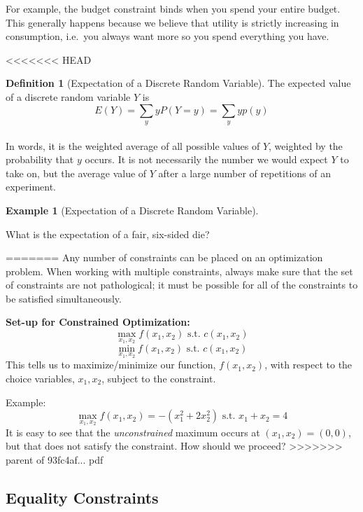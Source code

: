 \documentclass[]{book}
\theoremstyle{definition}
\newtheorem{definition}{Definition}[chapter]
\theoremstyle{definition}
\newtheorem{example}{Example}[chapter]
\theoremstyle{definition}
\theoremstyle{remark}
\begin{document}
For example, the budget constraint binds when you spend your entire budget. This generally happens because we believe that utility is strictly increasing in consumption, i.e.~you always want more so you spend everything you have.

<<<<<<< HEAD
\begin{definition}[Expectation of a Discrete Random Variable]
\protect\hypertarget{def:unnamed-chunk-83}{}{\label{def:unnamed-chunk-83} {} }The expected value of a discrete random variable \(Y\) is \[E(Y)=\sum\limits_{y} y P(Y=y)= \sum\limits_{y} y p(y)\]\\
In words, it is the weighted average of all possible values of \(Y\), weighted by the probability that \(y\) occurs. It is not necessarily the number we would expect \(Y\) to take on, but the average value of \(Y\) after a large number of repetitions of an experiment.
\end{definition}

\begin{example}[Expectation of a Discrete Random Variable]
\protect\hypertarget{exm:expectdiscrete}{}{\label{exm:expectdiscrete} {} }

What is the expectation of a fair, six-sided die?
\end{example}
=======
Any number of constraints can be placed on an optimization problem. When working with multiple constraints, always make sure that the set of constraints are not pathological; it must be possible for all of the constraints to be satisfied simultaneously.

\textbf{Set-up for Constrained Optimization:}
\[\max_{x_1,x_2} f(x_1,x_2) \text{ s.t. } c(x_1,x_2)\]
\[\min_{x_1,x_2} f(x_1,x_2) \text{ s.t. } c(x_1,x_2)\]
This tells us to maximize/minimize our function, \(f(x_1,x_2)\), with respect to the choice variables, \(x_1,x_2\), subject to the constraint.

Example:
\[\max_{x_1,x_2} f(x_1, x_2) = -(x_1^2 + 2x_2^2) \text{ s.t. }x_1 + x_2 = 4\]
It is easy to see that the \textit{unconstrained} maximum occurs at \((x_1, x_2) = (0,0)\), but that does not satisfy the constraint. How should we proceed?
>>>>>>> parent of 93fc4af... pdf

\hypertarget{equality-constraints}{%
\subsection*{Equality Constraints}\label{equality-constraints}}
\end{document}
